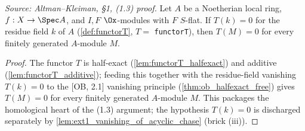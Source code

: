\begin{lemma}\leanok
[Homological core: $T(k(s)) = 0 \Rightarrow T(M) = 0$ for all $M$]
  \label{lem:functorT_eq_zero_of_residue}
  \textit{Source: Altman--Kleiman, §1, (1.3) proof.}
  Let $A$ be a Noetherian local ring, $f : X \to \Spec A$, and $I, F$
  $\Ox$-modules with $F$ $S$-flat. If $T(k) = 0$ for the residue field $k$ of $A$
  (\cref{def:functorT}, $T = $ \texttt{functorT}), then $T(M) = 0$ for every
  finitely generated $A$-module $M$.
  \begin{proof}
    The functor $T$ is half-exact (\cref{lem:functorT_halfexact}) and additive
    (\cref{lem:functorT_additive}); feeding this together with the residue-field
    vanishing $T(k) = 0$ to the [OB, 2.1] vanishing principle
    (\cref{thm:ob_halfexact_free}) gives $T(M) = 0$ for every finitely generated
    $A$-module $M$. This packages the homological heart of the (1.3) argument; the
    hypothesis $T(k) = 0$ is discharged separately by
    \cref{lem:ext1_vanishing_of_acyclic_chase} (brick (iii)).
  \end{proof}
\end{lemma}


